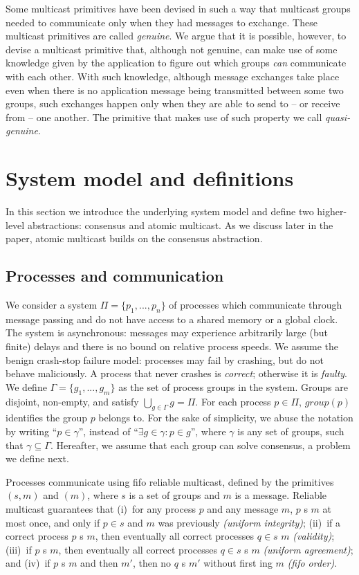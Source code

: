 \documentclass[times, 10pt]{article}
\begin{document}
Some multicast primitives have been devised in such a way that multicast groups needed to communicate only when they had messages to exchange. These multicast primitives are called \emph{genuine}. We argue that it is possible, however, to devise a multicast primitive that, although not genuine, can make use of some knowledge given by the application to figure out which groups \emph{can} communicate with each other. With such knowledge, although message exchanges take place even when there is no application message being transmitted between some two groups, such exchanges happen only when they are able to send to -- or receive from -- one another. The primitive that makes use of such property we call \emph{quasi-genuine}. 

\section{System model and definitions}
\label{sec:model}

In this section we introduce the underlying system model and define two higher-level abstractions: consensus and atomic multicast. As we discuss later in the paper, atomic multicast builds on the consensus abstraction.

\subsection{Processes and communication}

We consider a system $\Pi = \{ p_1, ..., p_n \}$ of processes which communicate through message passing and do not have access to a shared memory or a global clock. The system is asynchronous: messages may experience arbitrarily large (but finite) delays and there is no bound on relative process speeds. We assume the benign crash-stop failure model: processes may fail by crashing, but do not behave maliciously. A process that never crashes is \emph{correct}; otherwise it is \emph{faulty}. We define $\Gamma = \{ g_1, ..., g_m \}$ as the set of process groups in the system. Groups are disjoint, non-empty, and satisfy $\bigcup_{g \in \Gamma} g = \Pi$. For each process $p \in \Pi$, $group(p)$ identifies the group $p$ belongs to. For the sake of simplicity, we abuse the notation by writing ``$p \in \gamma$'', instead of ``$\exists g \in \gamma: p \in g$'', where $\gamma$ is any set of groups, such that $\gamma \subseteq \Gamma$. Hereafter, we assume that each group can solve consensus, a problem we define next.

Processes communicate using fifo reliable multicast, defined by the primitives \rmcast{}$(s,m)$ and \rmdel{}$(m)$, where $s$ is a set of groups and $m$ is a message. Reliable multicast guarantees that (i)~for any process $p$ and any message $m$, $p$ \rmdel{}s $m$ at most once, and only if $p \in s$ and $m$ was previously \rmcast{} \emph{(uniform integrity)}; (ii)~if a correct process $p$ \rmcast{}s $m$, then eventually all correct processes $q \in s$ \rmdel{} $m$ \emph{(validity)}; (iii)~if $p$ \rmdel{}s $m$, then eventually all correct processes $q \in s$ \rmdel{}s $m$ \emph{(uniform agreement)}; and (iv)~if $p$ \rmcast{}s $m$ and then $m'$, then no $q$ \rmdel{}s $m'$ without first \rmdel{}ing $m$ \emph{(fifo order)}.
\end{document}
